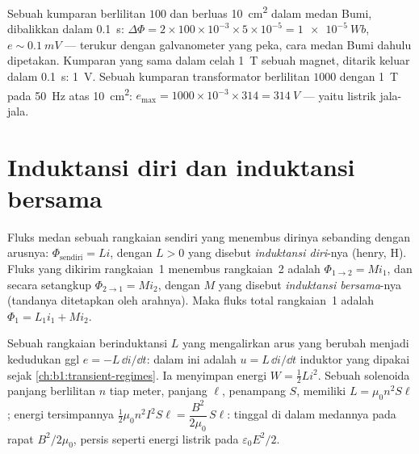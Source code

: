 \begin{example}\label{ex:b1:induction:orders}
Sebuah kumparan berlilitan $100$ dan berluas \qty{10}{cm^2} dalam medan Bumi, dibalikkan dalam
\qty{0.1}{s}: $\Delta\Phi = 2 \times 100 \times 10^{-3} \times 5 \times 10^{-5} = \qty{1e-5}{Wb}$,
$e \sim \qty{0.1}{mV}$ --- terukur dengan galvanometer yang peka, cara
medan Bumi dahulu dipetakan. Kumparan yang sama dalam celah \qty{1}{T}
sebuah magnet, ditarik keluar dalam \qty{0.1}{s}: \qty{1}{V}. Sebuah kumparan transformator
berlilitan $1000$ dengan \qty{1}{T} pada \qty{50}{Hz} atas \qty{10}{cm^2}: $e_{\max} =
1000 \times 10^{-3} \times 314 = \qty{314}{V}$ --- yaitu listrik jala-jala.
\end{example}

\section{Induktansi diri dan induktansi bersama}

\begin{definition}[Induktansi]\label{def:b1:induction:inductance}
Fluks medan sebuah rangkaian sendiri yang menembus dirinya sebanding dengan
arusnya: $\Phi_{\text{sendiri}} = Li$, dengan $L > 0$ yang disebut \emph{induktansi diri}-nya
(henry, \unit{H}). Fluks yang dikirim rangkaian~1 menembus rangkaian~2 adalah
$\Phi_{1 \to 2} = Mi_1$, dan secara setangkup $\Phi_{2 \to 1} = Mi_2$, dengan $M$
yang disebut \emph{induktansi bersama}-nya (tandanya ditetapkan oleh arahnya). Maka
fluks total rangkaian~1 adalah $\Phi_1 = L_1i_1 + Mi_2$.
\end{definition}

\begin{proposition}\label{prop:b1:induction:inductor}
Sebuah rangkaian berinduktansi $L$ yang mengalirkan arus yang berubah menjadi kedudukan
ggl $e = -L\,\dd i/\dd t$: dalam  ini adalah
 $u = L\,\dd i/\dd t$ induktor yang dipakai sejak
\cref{ch:b1:transient-regimes}. Ia menyimpan energi $W = \tfrac12Li^2$.
Sebuah solenoida panjang berlilitan $n$ tiap meter, panjang $\ell$, penampang $S$,
memiliki $L = \mu_0n^2S\ell$; energi tersimpannya $\tfrac12\mu_0n^2I^2S\ell =
\dfrac{B^2}{2\mu_0}\,S\ell$:  tinggal di dalam medannya pada
rapat $B^2/2\mu_0$, persis seperti energi listrik pada $\varepsilon_0E^2/2$.
\end{proposition}

